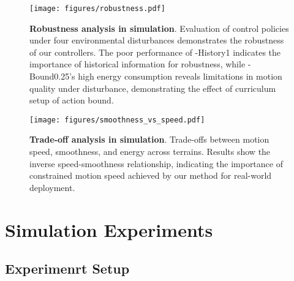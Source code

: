 






\begin{figure*}[t]
    \centering
    \texttt{[image: figures/robustness.pdf]}
    \vspace{-0.02in}
    \caption{\textbf{Robustness analysis in simulation}. Evaluation of control policies under four environmental disturbances demonstrates the robustness of our controllers. The poor performance of \ours-History1 indicates the importance of historical information for robustness, while \ours-Bound0.25's high energy consumption reveals limitations in motion quality under disturbance, demonstrating the effect of curriculum setup of action bound.}
    \label{fig:robustness}
    \vspace{-0.08in}
\end{figure*}

\begin{figure}[t]
    \centering
    \texttt{[image: figures/smoothness\_vs\_speed.pdf]}
    \caption{\textbf{Trade-off analysis in simulation}. Trade-offs between motion speed, smoothness, and energy across terrains. Results show the inverse speed-smoothness relationship, indicating the importance of constrained motion speed achieved by our method for real-world deployment.}
    \label{fig:tradeoff}
    \vspace{-0.1in}
\end{figure}

\section{Simulation Experiments}
\subsection{Experimenrt Setup} 
